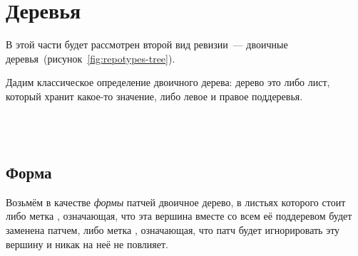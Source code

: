 \section{Деревья}



В этой части будет рассмотрен второй вид ревизии~--- двоичные
деревья~(рисунок~\ref{fig:repotypes-tree}).

Дадим классическое определение двоичного дерева: дерево это либо лист,
который хранит какое-то значение, либо левое и правое поддеревья.

\begin{code}%
\>  \AgdaSymbol{:}  \<%
\\
\>[0]\<[2]%
\>[2] \AgdaSymbol{:} \AgdaSymbol{(} \AgdaSymbol{:} \AgdaSymbol{)}  \<%
\\
\>[0]\<[2]%
\>[2] \AgdaSymbol{:} \AgdaSymbol{(}  \AgdaSymbol{:} \AgdaSymbol{)}  \<%
\end{code}
  
\subsection{Форма}

Возьмём в качестве \emph{формы} патчей двоичное дерево, в листьях
которого стоит либо метка , означающая,
что эта вершина вместе со всем её поддеревом будет заменена патчем,
либо метка , означающая, что патч будет
игнорировать эту вершину и никак на неё не повлияет.

\begin{code}%
\>  \AgdaSymbol{:}  \<%
\\
\>[0]\<[2]%
\>[2] \AgdaSymbol{:} \<%
\\
\>[0]\<[2]%
\>[2] \AgdaSymbol{:} \<%
\\
\>[0]\<[2]%
\>[2] \AgdaSymbol{:} \AgdaSymbol{(}  \AgdaSymbol{:} \AgdaSymbol{)}  \<%
\end{code}

